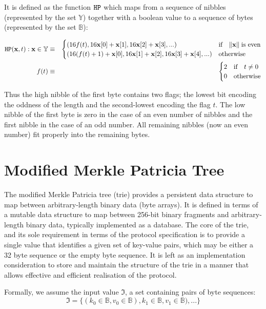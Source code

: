 \documentclass[9pt,oneside]{amsart}
\begin{document}
It is defined as the function $\mathtt{\tiny HP}$ which maps from a sequence of nibbles (represented by the set $\mathbb{Y}$) together with a boolean value to a sequence of bytes (represented by the set $\mathbb{B}$):

\begin{eqnarray}
\mathtt{\tiny HP}(\mathbf{x}, t): \mathbf{x} \in \mathbb{Y} & \equiv & \begin{cases}
(16f(t), 16\mathbf{x}[0] + \mathbf{x}[1], 16\mathbf{x}[2] + \mathbf{x}[3], ...) &
\text{if} \quad \lVert \mathbf{x} \rVert \; \text{is even} \\
(16(f(t) + 1) + \mathbf{x}[0], 16\mathbf{x}[1] + \mathbf{x}[2], 16\mathbf{x}[3] + \mathbf{x}[4], ...) &
\text{otherwise}
\end{cases} \\
f(t) & \equiv & \begin{cases} 2 & \text{if} \quad t \neq 0 \\ 0 & \text{otherwise} \end{cases}
\end{eqnarray}

Thus the high nibble of the first byte contains two flags; the lowest bit encoding the oddness of the length and the second-lowest encoding the flag $t$. The low nibble of the first byte is zero in the case of an even number of nibbles and the first nibble in the case of an odd number. All remaining nibbles (now an even number) fit properly into the remaining bytes.

\hypertarget{trie}{}
\section{Modified Merkle Patricia Tree}\label{app:trie}
The modified Merkle Patricia tree (trie) provides a persistent data structure to map between arbitrary-length binary data (byte arrays). It is defined in terms of a mutable data structure to map between 256-bit binary fragments and arbitrary-length binary data, typically implemented as a database. The core of the trie, and its sole requirement in terms of the protocol specification is to provide a single value that identifies a given set of key-value pairs, which may be either a 32 byte sequence or the empty byte sequence. It is left as an implementation consideration to store and maintain the structure of the trie in a manner that allows effective and efficient realisation of the protocol.

Formally, we assume the input value $\mathfrak{I}$, a set containing pairs of byte sequences:
\begin{equation}
\mathfrak{I} = \{ (k_0 \in \mathbb{B}, v_0 \in \mathbb{B}), k_1 \in \mathbb{B}, v_1 \in \mathbb{B}), ... \}
\end{equation}
\end{document}
